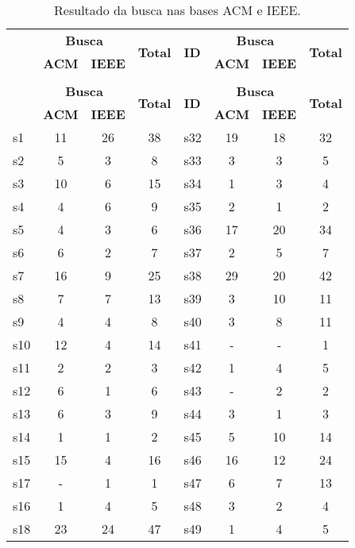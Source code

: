 \begin{longtable}{ l c c c | l c c c }
\caption{Resultado da busca nas bases ACM e IEEE.}
\label{search-table} \\
  \hline
  \hhline{ l c c c | l c c c |}
  \endfirsthead
  \hhline{ l c c c | l c c c |}
  \hline
   \multirow{2}{*}{\textbf{ID}} & \multicolumn{2}{c}{{\bf Busca}} & \multirow{2}{*}{\textbf{Total}} & \multirow{2}{*}{\textbf{ID}} & \multicolumn{2}{c}{{\bf Busca}} & \multirow{2}{*}{\textbf{Total}} \\
   & \textbf{ACM} & \textbf{IEEE} & & & \textbf{ACM} & \textbf{IEEE} & \\
  \hline
  \hhline{ l c c c | l c c c |}
  \endhead
  \hhline{----|----}
  \multicolumn{8}{c}{continua na próxima página} \\
  \hhline{----|----} \endfoot
  \hhline{----|----} \endlastfoot
   \multirow{2}{*}{\textbf{ID}} & \multicolumn{2}{c}{{\bf Busca}} & \multirow{2}{*}{\textbf{Total}} & \multirow{2}{*}{\textbf{ID}} & \multicolumn{2}{c}{{\bf Busca}} & \multirow{2}{*}{\textbf{Total}} \\
   & \textbf{ACM} & \textbf{IEEE} & & & \textbf{ACM} & \textbf{IEEE} & \\
  \hline
s1 & 11 & 26 & 38 & s32 & 19 & 18 & 32 \\
s2 & 5 & 3 & 8 & s33 & 3 & 3 & 5 \\
s3 & 10 & 6 & 15 & s34 & 1 & 3 & 4 \\
s4 & 4 & 6 & 9 & s35 & 2 & 1 & 2 \\
s5 & 4 & 3 & 6 & s36 & 17 & 20 & 34 \\
s6 & 6 & 2 & 7 & s37 & 2 & 5 & 7 \\
s7 & 16 & 9 & 25 & s38 & 29 & 20 & 42 \\
s8 & 7 & 7 & 13 & s39 & 3 & 10 & 11 \\
s9 & 4 & 4 & 8 & s40 & 3 & 8 & 11 \\
s10 & 12 & 4 & 14 & s41 & - & - & 1 \\
s11 & 2 & 2 & 3 & s42 & 1 & 4 & 5 \\
s12 & 6 & 1 & 6 & s43 & - & 2 & 2 \\
s13 & 6 & 3 & 9 & s44 & 3 & 1 & 3 \\
s14 & 1 & 1 & 2 & s45 & 5 & 10 & 14 \\
s15 & 15 & 4 & 16 & s46 & 16 & 12 & 24 \\
s17 & - & 1 & 1 & s47 & 6 & 7 & 13 \\
s16 & 1 & 4 & 5 & s48 & 3 & 2 & 4 \\
s18 & 23 & 24 & 47 & s49 & 1 & 4 & 5 \\

\end{longtable}
